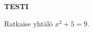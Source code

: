 \documentclass[]{amsart}
\begin{document}
\noindent
\begin{center}
{\bf
TESTI
}
\end{center}

\parskip=20pt

Ratkaise yhtälö $x^2+5=9$.
\end{document}
